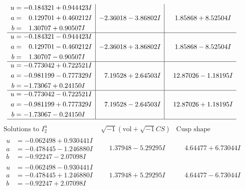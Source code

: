 \documentclass[1p]{elsarticle_modified}
\theoremstyle{definition}
\newcommand{\I}{\sqrt{-1}}
\begin{document}
$$\begin{array}{c|c|c}
\begin{aligned}
u &= -0.184321 + 0.944423 I \\
a &= \phantom{-}0.129701 + 0.460212 I \\
b &= \phantom{-}1.30707 + 0.90507 I\end{aligned}
 & -2.36018 - 3.86802 I & \phantom{-}1.85868 + 8.52504 I \\ \hline\begin{aligned}
u &= -0.184321 - 0.944423 I \\
a &= \phantom{-}0.129701 - 0.460212 I \\
b &= \phantom{-}1.30707 - 0.90507 I\end{aligned}
 & -2.36018 + 3.86802 I & \phantom{-}1.85868 - 8.52504 I \\ \hline\begin{aligned}
u &= -0.773042 + 0.722521 I \\
a &= -0.981199 - 0.777329 I \\
b &= -1.73067 + 0.24150 I\end{aligned}
 & \phantom{-}7.19528 + 2.64503 I & \phantom{-}12.87026 - 1.18195 I \\ \hline\begin{aligned}
u &= -0.773042 - 0.722521 I \\
a &= -0.981199 + 0.777329 I \\
b &= -1.73067 - 0.24150 I\end{aligned}
 & \phantom{-}7.19528 - 2.64503 I & \phantom{-}12.87026 + 1.18195 I\\
 \hline 
 \end{array}$$\newpage$$\begin{array}{c|c|c}  
\text{Solutions to }I^u_{2}& \I (\text{vol} + \sqrt{-1}CS) & \text{Cusp shape}\\
 \hline 
\begin{aligned}
u &= -0.062498 + 0.930441 I \\
a &= -0.478445 - 1.246880 I \\
b &= -0.92247 - 2.07098 I\end{aligned}
 & \phantom{-}1.37948 - 5.29295 I & \phantom{-}4.64477 + 6.73044 I \\ \hline\begin{aligned}
u &= -0.062498 - 0.930441 I \\
a &= -0.478445 + 1.246880 I \\
b &= -0.92247 + 2.07098 I\end{aligned}
 & \phantom{-}1.37948 + 5.29295 I & \phantom{-}4.64477 - 6.73044 I \\ \hline\begin{aligned}

\end{aligned}
\end{array}$$
\end{document}
